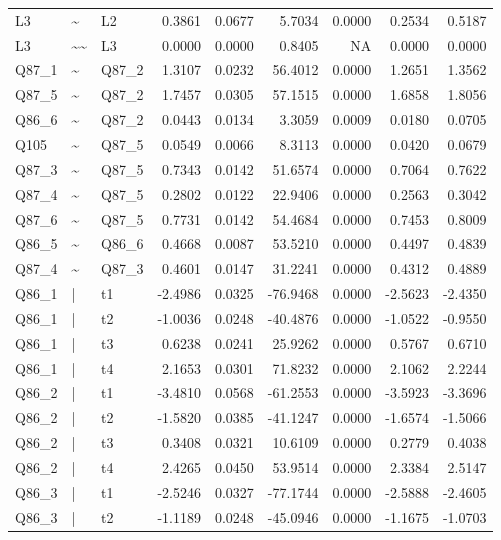 \begin{longtable}{lllrrrrrr}
L3 & \textasciitilde{} & L2 & 0.3861 & 0.0677 & 5.7034 & 0.0000 & 0.2534 & 0.5187\\
L3 & \textasciitilde{}\textasciitilde{} & L3 & 0.0000 & 0.0000 & 0.8405 & NA & 0.0000 & 0.0000\\
Q87\_1 & \textasciitilde{} & Q87\_2 & 1.3107 & 0.0232 & 56.4012 & 0.0000 & 1.2651 & 1.3562\\
Q87\_5 & \textasciitilde{} & Q87\_2 & 1.7457 & 0.0305 & 57.1515 & 0.0000 & 1.6858 & 1.8056\\
\addlinespace
Q86\_6 & \textasciitilde{} & Q87\_2 & 0.0443 & 0.0134 & 3.3059 & 0.0009 & 0.0180 & 0.0705\\
Q105 & \textasciitilde{} & Q87\_5 & 0.0549 & 0.0066 & 8.3113 & 0.0000 & 0.0420 & 0.0679\\
Q87\_3 & \textasciitilde{} & Q87\_5 & 0.7343 & 0.0142 & 51.6574 & 0.0000 & 0.7064 & 0.7622\\
Q87\_4 & \textasciitilde{} & Q87\_5 & 0.2802 & 0.0122 & 22.9406 & 0.0000 & 0.2563 & 0.3042\\
Q87\_6 & \textasciitilde{} & Q87\_5 & 0.7731 & 0.0142 & 54.4684 & 0.0000 & 0.7453 & 0.8009\\
\addlinespace
Q86\_5 & \textasciitilde{} & Q86\_6 & 0.4668 & 0.0087 & 53.5210 & 0.0000 & 0.4497 & 0.4839\\
Q87\_4 & \textasciitilde{} & Q87\_3 & 0.4601 & 0.0147 & 31.2241 & 0.0000 & 0.4312 & 0.4889\\
Q86\_1 & | & t1 & -2.4986 & 0.0325 & -76.9468 & 0.0000 & -2.5623 & -2.4350\\
Q86\_1 & | & t2 & -1.0036 & 0.0248 & -40.4876 & 0.0000 & -1.0522 & -0.9550\\
Q86\_1 & | & t3 & 0.6238 & 0.0241 & 25.9262 & 0.0000 & 0.5767 & 0.6710\\
\addlinespace
Q86\_1 & | & t4 & 2.1653 & 0.0301 & 71.8232 & 0.0000 & 2.1062 & 2.2244\\
Q86\_2 & | & t1 & -3.4810 & 0.0568 & -61.2553 & 0.0000 & -3.5923 & -3.3696\\
Q86\_2 & | & t2 & -1.5820 & 0.0385 & -41.1247 & 0.0000 & -1.6574 & -1.5066\\
Q86\_2 & | & t3 & 0.3408 & 0.0321 & 10.6109 & 0.0000 & 0.2779 & 0.4038\\
Q86\_2 & | & t4 & 2.4265 & 0.0450 & 53.9514 & 0.0000 & 2.3384 & 2.5147\\
\addlinespace
Q86\_3 & | & t1 & -2.5246 & 0.0327 & -77.1744 & 0.0000 & -2.5888 & -2.4605\\
Q86\_3 & | & t2 & -1.1189 & 0.0248 & -45.0946 & 0.0000 & -1.1675 & -1.0703\\

\end{longtable}
